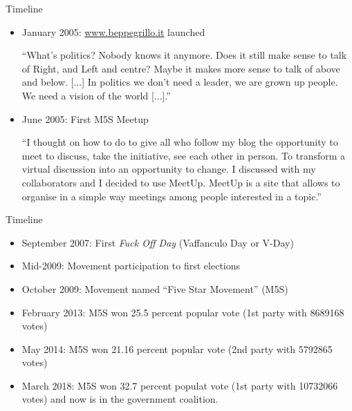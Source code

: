 \documentclass[serif, aspectratio=169]{beamer}
\begin{document}
\begin{frame}
{Timeline}

\begin{itemize}

\item January 2005: \url{www.beppegrillo.it} launched

\begin{exampleblock}{}
  {\scriptsize ``What's politics? Nobody knows it anymore. Does it still make sense to talk of Right, and Left and centre? Maybe it makes more sense to talk of above and below. [...] In politics we don't need a leader, we are grown up people. We need a vision of the world [...].''}
  \hspace*{}
\end{exampleblock}

\item June 2005: First M5S Meetup

\begin{exampleblock}{}
  {\scriptsize ``I thought on how to do to give all who follow my blog the opportunity to meet to discuss, take the initiative, see each other in person. To transform a virtual discussion into an opportunity to change. I discussed with my collaborators and I decided to use MeetUp. MeetUp is a site that allows to organise in a simple way meetings among people interested in a topic.''}
  \hspace*{}
\end{exampleblock}

\end{itemize}

\end{frame}


\begin{frame}
{Timeline}

\begin{itemize}
\item September 2007: First \textit{Fuck Off Day} (Vaffanculo Day or V-Day)
\item Mid-2009: Movement participation to first elections
\item October 2009: Movement named \enquote{Five Star Movement} (M5S)
\item February 2013: M5S won \num{25.5} percent popular vote (1st party with \num{8689168} votes)
\item May 2014: M5S won \num{21.16} percent popular vote (2nd party with \num{5792865} votes)
\item March 2018: M5S won \num{32.7} percent populat vote (1st party with \num{10732066} votes) and now is in the government coalition.

\end{itemize}
\end{frame}
\end{document}

